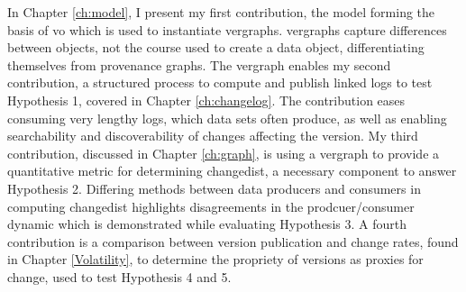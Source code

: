 
In Chapter \ref{ch:model}, I present my first contribution, the model forming the basis of \gls{vo} which is used to instantiate \glspl{vergraph}.
\Glspl{vergraph} capture differences between objects, not the course used to create a data object, differentiating themselves from provenance graphs.
The \gls{vergraph} enables my second contribution, a structured process to compute and publish \gls{linked} \glspl{log} to test Hypothesis 1, covered in Chapter \ref{ch:changelog}.
The contribution eases consuming very lengthy logs, which data sets often produce, as well as enabling searchability and discoverability of \glspl{change} affecting the \gls{version}.
My third contribution, discussed in Chapter \ref{ch:graph}, is using a \gls{vergraph} to provide a quantitative metric for determining \gls{changedist}, a necessary component to answer Hypothesis 2.
Differing methods between data producers and consumers in computing \gls{changedist} highlights disagreements in the prodcuer/consumer dynamic which is demonstrated while evaluating Hypothesis 3.
A fourth contribution is a comparison between version publication and change rates, found in Chapter \ref{Volatility}, to determine the propriety of versions as proxies for change, used to test Hypothesis 4 and 5.

